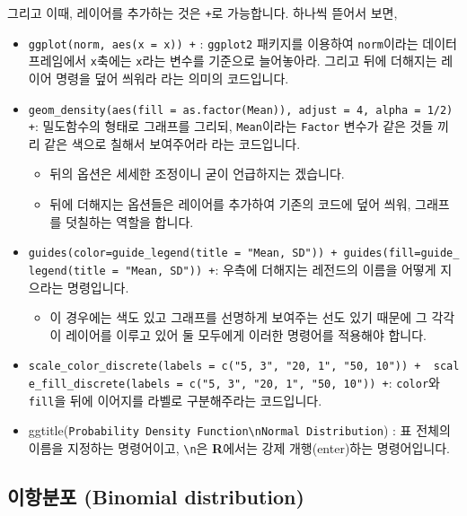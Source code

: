 \documentclass[]{book}
\providecommand{\tightlist}{%
  \setlength{\itemsep}{0pt}\setlength{\parskip}{0pt}}
\begin{document}
그리고 이때, 레이어를 추가하는 것은 \texttt{+}로 가능합니다. 하나씩 뜯어서 보면,

\begin{itemize}
\tightlist
\item
  \texttt{ggplot(norm,\ aes(x\ =\ x))\ +} : \texttt{ggplot2} 패키지를 이용하여 \texttt{norm}이라는 데이터 프레임에서 \texttt{x}축에는 \texttt{x}라는 변수를 기준으로 늘어놓아라. 그리고 뒤에 더해지는 레이어 명령을 덮어 씌워라 라는 의미의 코드입니다.
\item
  \texttt{geom\_density(aes(fill\ =\ as.factor(Mean)),\ adjust\ =\ 4,\ alpha\ =\ 1/2)\ +}: 밀도함수의 형태로 그래프를 그리되, \texttt{Mean}이라는 \texttt{Factor} 변수가 같은 것들 끼리 같은 색으로 칠해서 보여주어라 라는 코드입니다.

  \begin{itemize}
  \tightlist
  \item
    뒤의 옵션은 세세한 조정이니 굳이 언급하지는 겠습니다.
  \item
    뒤에 더해지는 옵션들은 레이어를 추가하여 기존의 코드에 덮어 씌워, 그래프를 덧칠하는 역할을 합니다.
  \end{itemize}
\item
  \texttt{guides(color=guide\_legend(title\ =\ "Mean,\ SD"))\ +\ guides(fill=guide\_legend(title\ =\ "Mean,\ SD"))\ +}: 우측에 더해지는 레전드의 이름을 어떻게 지으라는 명령입니다.

  \begin{itemize}
  \tightlist
  \item
    이 경우에는 색도 있고 그래프를 선명하게 보여주는 선도 있기 때문에 그 각각이 레이어를 이루고 있어 둘 모두에게 이러한 명령어를 적용해야 합니다.
  \end{itemize}
\item
  \texttt{scale\_color\_discrete(labels\ =\ c("5,\ 3",\ "20,\ 1",\ "50,\ 10"))\ +\ \ scale\_fill\_discrete(labels\ =\ c("5,\ 3",\ "20,\ 1",\ "50,\ 10"))\ +}: \texttt{color}와 \texttt{fill}을 뒤에 이어지를 라벨로 구분해주라는 코드입니다.
\item
  ggtitle(\texttt{Probability\ Density\ Function\textbackslash{}nNormal\ Distribution}) : 표 전체의 이름을 지정하는 명령어이고, \texttt{\textbackslash{}n}은 \textbf{R}에서는 강제 개행(enter)하는 명령어입니다.
\end{itemize}

\hypertarget{uxc774uxd56duxbd84uxd3ec-binomial-distribution}{%
\subsection{이항분포 (Binomial distribution)}\label{uxc774uxd56duxbd84uxd3ec-binomial-distribution}}
\end{document}
